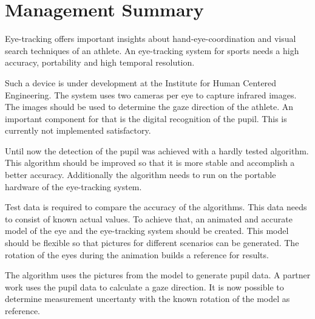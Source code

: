 \chapter*{Management Summary}
\label{chap:managementSummary}

Eye-tracking offers important insights about hand-eye-coordination and visual search techniques of an athlete. An eye-tracking system for sports needs a high accuracy, portability and high temporal resolution.

Such a device is under development at the Institute for Human Centered Engineering. The system uses two cameras per eye to capture infrared images. The images should be used to determine the gaze direction of the athlete. An important component for that is the digital recognition of the pupil. This is currently not implemented satisfactory.

Until now the detection of the pupil was achieved with a hardly tested algorithm. This algorithm should be improved so that it is more stable and accomplish a better accuracy. Additionally the algorithm needs to run on the portable hardware of the eye-tracking system.

Test data is required to compare the accuracy of the algorithms. This data needs to consist of known actual values. To achieve that, an animated and accurate model of the eye and the eye-tracking system should be created. This model should be flexible so that pictures for different scenarios can be generated. The rotation of the eyes during the animation builds a reference for results.

The algorithm uses the pictures from the model to generate pupil data. A partner work uses the pupil data to calculate a gaze direction. It is now possible to determine measurement uncertanty with the known rotation of the model as reference.
